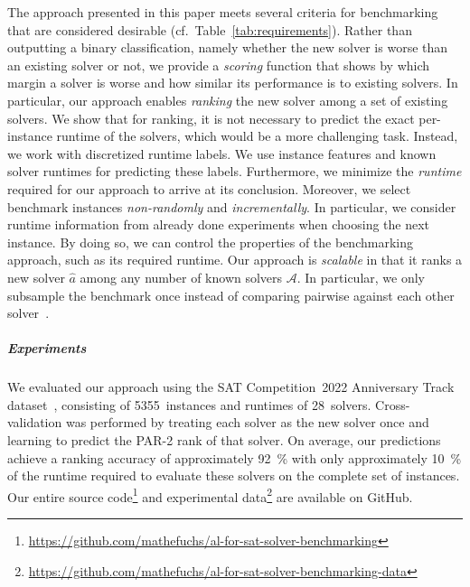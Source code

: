 \documentclass[sn-basic, Numbered]{sn-jnl} %
\begin{document}
The approach presented in this paper meets several criteria for benchmarking that are considered desirable (cf.~Table~\ref{tab:requirements}).
Rather than outputting a binary classification, namely whether the new solver is worse than an existing solver or not, we provide a \emph{scoring} function that shows by which margin a solver is worse and how similar its performance is to existing solvers.
In particular, our approach enables \emph{ranking} the new solver among a set of existing solvers.
We show that for ranking, it is not necessary to predict the exact per-instance runtime of the solvers, which would be a more challenging task.
Instead, we work with discretized runtime labels.
We use instance features and known solver runtimes for predicting these labels.
Furthermore, we minimize the \emph{runtime} required for our approach to arrive at its conclusion.
Moreover, we select benchmark instances \emph{non-randomly} and \emph{incrementally}.
In particular, we consider runtime information from already done experiments when choosing the next instance.
By doing so, we can control the properties of the benchmarking approach, such as its required runtime.
Our approach is \emph{scalable} in that it ranks a new solver $\hat{a}$ among any number of known solvers $\mathcal{A}$.
In particular, we only subsample the benchmark once instead of comparing pairwise against each other solver~\cite{MatriconAFSH21}.

\subparagraph{Experiments}

We evaluated our approach using the SAT Competition~2022 Anniversary Track dataset~\cite{sat2022}, consisting of 5355~instances and runtimes of 28~solvers.
Cross-validation was performed by treating each solver as the new solver once and learning to predict the PAR-2 rank of that solver.
On average, our predictions achieve a ranking accuracy of approximately \SI{92}{\%} with only approximately \SI{10}{\%} of the runtime required to evaluate these solvers on the complete set of instances.
Our entire source code\footnote{\url{https://github.com/mathefuchs/al-for-sat-solver-benchmarking}} and experimental data\footnote{\url{https://github.com/mathefuchs/al-for-sat-solver-benchmarking-data}} are available on GitHub.
\end{document}
